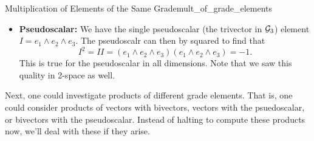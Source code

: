 \begin{ex}{Multiplication of Elements of the Same Grade}{mult_of_grade_elements}
\begin{itemize}
\[\begin{cases}
        -1 & \textrm{if $ijk$ is an odd permutation of $123$}\\
        0 & \textrm{otherwise}\end{cases}.
        \]
        \item \textbf{Pseudoscalar:} We have the single pseudoscalar (the trivector in $\mathcal{G}_3$) element $I=e_1\wedge e_2 \wedge e_3$. The pseudoscalr can then by squared to find that
        \[
        I^2 = II = (e_1 \wedge e_2 \wedge e_3)(e_1 \wedge e_2 \wedge e_3) = -1.
        \]
        This is true for the pseudoscalar in all dimensions. Note that we saw this quality in 2-space as well.
    \end{itemize}
\end{ex}
\newpage

Next, one could investigate products of different grade elements. That is, one could consider products of vectors with bivectors, vectors with the psuedoscalar, or bivectors with the pseudoscalar.  Instead of halting to compute these products now, we'll deal with these if they arise.

